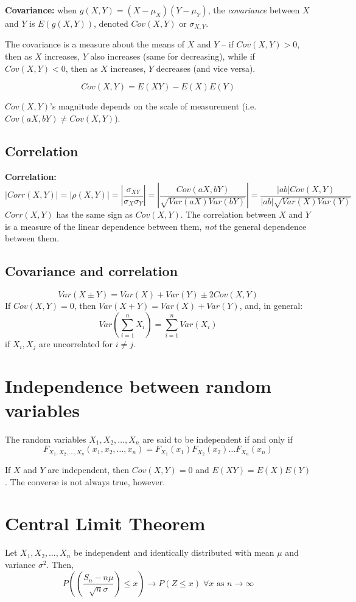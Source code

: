 \documentclass[15pt]{article}
\begin{document}
\textbf{Covariance:} when $g(X,Y) = (X - \mu_X) (Y - \mu_Y)$, the \emph{covariance} between $X$ and $Y$ is $E(g(X,Y))$, denoted $Cov(X,Y)$ or $\sigma_{X,Y}$.

The covariance is a measure about the means of $X$ and $Y$ -- if $Cov(X,Y) > 0$, then as $X$ increases, $Y$ also increases (same for decreasing), while if $Cov(X,Y) < 0$, then as $X$ increases, $Y$ decreases (and vice versa).

\[
    Cov(X,Y) = E(XY) - E(X)E(Y)
\]

$Cov(X,Y)$'s magnitude depends on the scale of measurement (i.e. $Cov(aX, bY) \neq Cov(X,Y)$).

\subsection{Correlation}
\textbf{Correlation:} 
\[
    |Corr(X,Y)| = |\rho(X,Y)| = \left|\frac{\sigma_{XY}}{\sigma_X \sigma_Y}\right| = \left|\frac{Cov(aX,bY)}{\sqrt{Var(aX) Var(bY)}}\right| = \frac{|ab| Cov(X,Y)}{|ab| \sqrt{Var(X) Var(Y)}}
\]
$Corr(X,Y)$ has the same sign as $Cov(X,Y)$. The correlation between $X$ and $Y$ is a measure of the linear dependence between them, \emph{not} the general dependence between them.

\subsection{Covariance and correlation}
\[
    Var(X \pm Y) = Var(X) + Var(Y) \pm 2 Cov(X,Y)
\]
If $Cov(X,Y) = 0$, then $Var(X + Y) = Var(X) + Var(Y)$, and, in general:
\[
    Var\left(\sum_{i=1}^n X_i\right) = \sum_{i=1}^n Var(X_i)
\]
if $X_i, X_j$ are uncorrelated for $i \neq j$.

\section{Independence between random variables}
The random variables $X_1, X_2, \dots, X_n$ are said to be independent if and only if
\[
    F_{X_1, X_2, \dots, X_n} (x_1, x_2, \dots, x_n) = F_{X_1} (x_1) F_{X_2} (x_2) \dots F_{X_n} (x_n)
\]

If $X$ and $Y$ are independent, then $Cov(X,Y) = 0$ and $E(XY) = E(X) E(Y)$. The converse is not always true, however. 

\section{Central Limit Theorem}
Let $X_1, X_2, \dots, X_n$ be independent and identically distributed with mean $\mu$ and variance $\sigma^2$. Then,
\[
    P\left(\left(\frac{S_n - n \mu}{\sqrt{n} \sigma}\right) \leq x\right) \rightarrow P(Z \leq x) \; \forall x \text{ as } n \rightarrow \infty
\]
\end{document}
